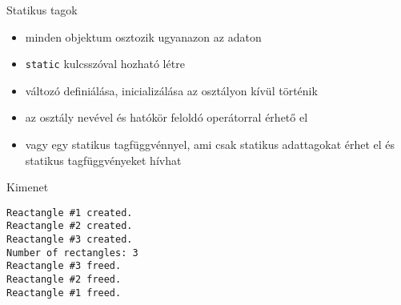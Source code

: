 \documentclass[usenames,dvipsnames,aspectratio=169]{beamer}
\begin{document}
\begin{frame}
    Statikus tagok
    \begin{itemize}
        \item minden objektum osztozik ugyanazon az adaton
        \item \texttt{static} kulcsszóval hozható létre
        \item változó definiálása, inicializálása  az osztályon kívül történik
        \item az osztály nevével és hatókör feloldó operátorral érhető el
        \item vagy egy statikus tagfüggvénnyel, ami csak statikus adattagokat érhet el és statikus tagfüggvényeket hívhat
    \end{itemize}
\end{frame}

\begin{frame}
    \begin{exampleblock}{}
        \small
        
        
    \end{exampleblock}
\end{frame}

\begin{frame}
    \begin{exampleblock}{}
        \vspace{-.3cm}
        \scriptsize
        
        
        \vspace{-.3cm}
    \end{exampleblock}
\end{frame}

\begin{frame}[fragile]
    \begin{exampleblock}{}
        \scriptsize
        
    \end{exampleblock}
    \begin{block}{Kimenet}
        \scriptsize
        \vspace{-.3cm}
        \begin{verbatim}
Reactangle #1 created.
Reactangle #2 created.
Reactangle #3 created.
Number of rectangles: 3
Reactangle #3 freed.
Reactangle #2 freed.
Reactangle #1 freed.
\end{verbatim}
\vspace{-.3cm}
    \end{block}
\end{frame}
\end{document}
